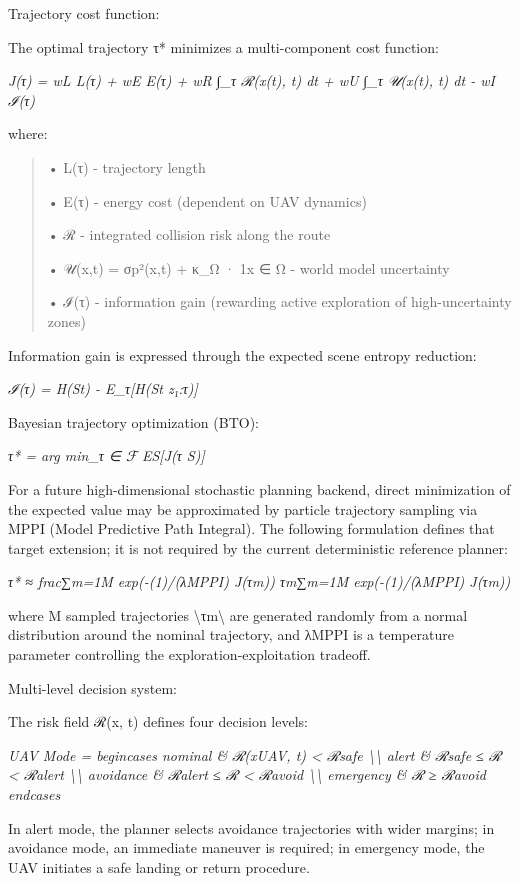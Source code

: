 \documentclass[
]{article}
\begin{document}
Trajectory cost function:

The optimal trajectory τ* minimizes a multi-component cost function:

\emph{J(τ) = wL L(τ) + wE E(τ) + wR ∫\_τ ℛ(x(t), t) dt + wU ∫\_τ 𝒰(x(t),
t) dt - wI ℐ(τ)}

where:

\begin{quote}
• L(τ) - trajectory length

• E(τ) - energy cost (dependent on UAV dynamics)

• ℛ - integrated collision risk along the route

• 𝒰(x,t) = σp²(x,t) + κ\_Ω · 1x ∈ Ω - world model uncertainty

• ℐ(τ) - information gain (rewarding active exploration of
high-uncertainty zones)
\end{quote}

Information gain is expressed through the expected scene entropy
reduction:

\emph{ℐ(τ) = H(St) - E\_τ{[}H(St \textbar{} z₁:τ){]}}

Bayesian trajectory optimization (BTO):

\emph{τ* = arg min\_τ ∈ ℱ ES{[}J(τ \textbar{} S){]}}

For a future high-dimensional stochastic planning backend, direct
minimization of the expected value may be approximated by particle
trajectory sampling via MPPI (Model Predictive Path Integral). The
following formulation defines that target extension; it is not required
by the current deterministic reference planner:

\emph{τ* ≈ frac∑m=1M exp(-(1)/(λMPPI) J(τm)) τm∑m=1M exp(-(1)/(λMPPI)
J(τm))}

where M sampled trajectories \textbackslash τm\textbackslash{} are
generated randomly from a normal distribution around the nominal
trajectory, and λMPPI is a temperature parameter controlling the
exploration-exploitation tradeoff.

Multi-level decision system:

The risk field ℛ(x, t) defines four decision levels:

\emph{UAV Mode = begincases nominal \& ℛ(xUAV, t) \textless{} ℛsafe
\textbackslash\textbackslash{} alert \& ℛsafe ≤ ℛ \textless{} ℛalert
\textbackslash\textbackslash{} avoidance \& ℛalert ≤ ℛ \textless{}
ℛavoid \textbackslash\textbackslash{} emergency \& ℛ ≥ ℛavoid endcases}

In alert mode, the planner selects avoidance trajectories with wider
margins; in avoidance mode, an immediate maneuver is required; in
emergency mode, the UAV initiates a safe landing or return procedure.
\end{document}
